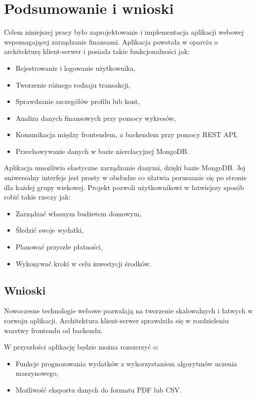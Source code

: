 \chapter{Podsumowanie i wnioski }

Celem niniejszej pracy było zaprojektowanie i implementacja aplikacji webowej wspomagającej zarządzanie finansami. Aplikacja powstała w oparciu o architekturę klient-serwer i posiada takie funkcjonalności jak:
\begin{itemize}
	\item Rejestrowanie i logowanie użytkownika,
	\item Tworzenie różnego rodzaju transakcji,
	\item Sprawdzanie szczegółów profilu lub kont,
	\item Analiza danych finansowych przy pomocy wykresów,
	\item Komunikacja między frontendem, a backendem przy pomocy REST API,
	\item Przechowywanie danych w bazie nierelacyjnej MongoDB.
\end{itemize}
Aplikacja umożliwia elastyczne zarządzanie danymi, dzięki bazie MongoDB. Jej uniwersalny interfejs jest prosty w obsłudze co ułatwia poruszanie się po stronie dla każdej grupy wiekowej. Projekt pozwoli użytkownikowi w łatwiejszy sposób robić takie rzeczy jak:
\begin{itemize}
	\item Zarządzać własnym budżetem domowym,
	\item Śledzić swoje wydatki,
	\item Planować przyszłe płatności,
	\item Wykonywać kroki w celu inwestycji środków.
\end{itemize}
\section*{Wnioski}
Nowoczesne technologie webowe pozwalają na tworzenie skalowalnych i łatwych w rozwoju aplikacji. Architektura klient-serwer sprawdziła się w rozdzieleniu warstwy frontendu od backendu.

W przyszłości aplikację będzie można rozszerzyć o:
\begin{itemize}
	\item Funkcje prognozowania wydatków z wykorzystaniem algorytmów uczenia maszynowego,
	\item Możliwość eksportu danych do formatu PDF lub CSV.
\end{itemize}

